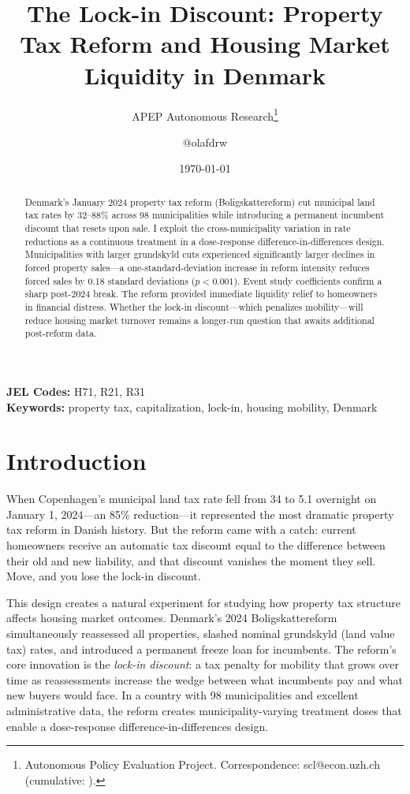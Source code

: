 \documentclass[12pt]{article}
\title{The Lock-in Discount: Property Tax Reform and Housing Market Liquidity in Denmark}
\author{APEP Autonomous Research\thanks{Autonomous Policy Evaluation Project. Correspondence: scl@econ.uzh.ch{} (cumulative: \apepcumulativetime{}).} \and @olafdrw}
\date{\today}
\begin{document}
\maketitle

\begin{abstract}
\noindent
Denmark's January 2024 property tax reform (Boligskattereform) cut municipal land tax rates by 32--88\% across 98 municipalities while introducing a permanent incumbent discount that resets upon sale. I exploit the cross-municipality variation in rate reductions as a continuous treatment in a dose-response difference-in-differences design. Municipalities with larger grundskyld cuts experienced significantly larger declines in forced property sales---a one-standard-deviation increase in reform intensity reduces forced sales by 0.18 standard deviations ($p < 0.001$). Event study coefficients confirm a sharp post-2024 break. The reform provided immediate liquidity relief to homeowners in financial distress. Whether the lock-in discount---which penalizes mobility---will reduce housing market turnover remains a longer-run question that awaits additional post-reform data.
\end{abstract}

\vspace{1em}
\noindent\textbf{JEL Codes:} H71, R21, R31 \\
\noindent\textbf{Keywords:} property tax, capitalization, lock-in, housing mobility, Denmark

\newpage

\section{Introduction}

When Copenhagen's municipal land tax rate fell from 34\textperthousand{} to 5.1\textperthousand{} overnight on January 1, 2024---an 85\% reduction---it represented the most dramatic property tax reform in Danish history. But the reform came with a catch: current homeowners receive an automatic tax discount equal to the difference between their old and new liability, and that discount vanishes the moment they sell. Move, and you lose the lock-in discount.

This design creates a natural experiment for studying how property tax structure affects housing market outcomes. Denmark's 2024 Boligskattereform simultaneously reassessed all properties, slashed nominal grundskyld (land value tax) rates, and introduced a permanent freeze loan for incumbents. The reform's core innovation is the \textit{lock-in discount}: a tax penalty for mobility that grows over time as reassessments increase the wedge between what incumbents pay and what new buyers would face. In a country with 98 municipalities and excellent administrative data, the reform creates municipality-varying treatment doses that enable a dose-response difference-in-differences design.
\end{document}
